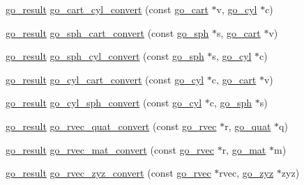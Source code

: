 \begin{DoxyCompactItemize}
\item 
\hyperlink{gotypes_8h_a55d48b38cd959f63c7e8db8337a9792a}{go\-\_\-result} \hyperlink{namespacegomotion_a7647c5352af65cc2c74b6ec1543f16dd}{go\-\_\-cart\-\_\-cyl\-\_\-convert} (const \hyperlink{structgomotion_1_1go__cart}{go\-\_\-cart} $\ast$v, \hyperlink{structgomotion_1_1go__cyl}{go\-\_\-cyl} $\ast$c)
\item 
\hyperlink{gotypes_8h_a55d48b38cd959f63c7e8db8337a9792a}{go\-\_\-result} \hyperlink{namespacegomotion_a36a8f262d1a993877a8d31f07eff7889}{go\-\_\-sph\-\_\-cart\-\_\-convert} (const \hyperlink{structgomotion_1_1go__sph}{go\-\_\-sph} $\ast$s, \hyperlink{structgomotion_1_1go__cart}{go\-\_\-cart} $\ast$v)
\item 
\hyperlink{gotypes_8h_a55d48b38cd959f63c7e8db8337a9792a}{go\-\_\-result} \hyperlink{namespacegomotion_af03af2d32b5e62c1ead37c2349cc2f46}{go\-\_\-sph\-\_\-cyl\-\_\-convert} (const \hyperlink{structgomotion_1_1go__sph}{go\-\_\-sph} $\ast$s, \hyperlink{structgomotion_1_1go__cyl}{go\-\_\-cyl} $\ast$c)
\item 
\hyperlink{gotypes_8h_a55d48b38cd959f63c7e8db8337a9792a}{go\-\_\-result} \hyperlink{namespacegomotion_abeed59a4cd9519af1b4aaed3c116bd39}{go\-\_\-cyl\-\_\-cart\-\_\-convert} (const \hyperlink{structgomotion_1_1go__cyl}{go\-\_\-cyl} $\ast$c, \hyperlink{structgomotion_1_1go__cart}{go\-\_\-cart} $\ast$v)
\item 
\hyperlink{gotypes_8h_a55d48b38cd959f63c7e8db8337a9792a}{go\-\_\-result} \hyperlink{namespacegomotion_ab0bdb87e30818c0fb99166f66f04f847}{go\-\_\-cyl\-\_\-sph\-\_\-convert} (const \hyperlink{structgomotion_1_1go__cyl}{go\-\_\-cyl} $\ast$c, \hyperlink{structgomotion_1_1go__sph}{go\-\_\-sph} $\ast$s)
\item 
\hyperlink{gotypes_8h_a55d48b38cd959f63c7e8db8337a9792a}{go\-\_\-result} \hyperlink{namespacegomotion_a5241e24d5f0f0202cc947b7abe59c94d}{go\-\_\-rvec\-\_\-quat\-\_\-convert} (const \hyperlink{structgomotion_1_1go__rvec}{go\-\_\-rvec} $\ast$r, \hyperlink{structgomotion_1_1go__quat}{go\-\_\-quat} $\ast$q)
\item 
\hyperlink{gotypes_8h_a55d48b38cd959f63c7e8db8337a9792a}{go\-\_\-result} \hyperlink{namespacegomotion_adf77bee641ddc2ab262b5a7c1037b5fb}{go\-\_\-rvec\-\_\-mat\-\_\-convert} (const \hyperlink{structgomotion_1_1go__rvec}{go\-\_\-rvec} $\ast$r, \hyperlink{structgomotion_1_1go__mat}{go\-\_\-mat} $\ast$m)
\item 
\hyperlink{gotypes_8h_a55d48b38cd959f63c7e8db8337a9792a}{go\-\_\-result} \hyperlink{namespacegomotion_a55405939228fa6cf1b4e417361e31cf1}{go\-\_\-rvec\-\_\-zyz\-\_\-convert} (const \hyperlink{structgomotion_1_1go__rvec}{go\-\_\-rvec} $\ast$rvec, \hyperlink{structgomotion_1_1go__zyz}{go\-\_\-zyz} $\ast$zyz)

\end{DoxyCompactItemize}
